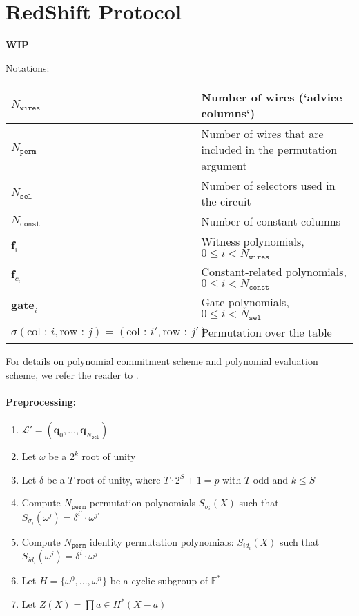 \section{RedShift Protocol}
\label{section:protocol}
\textbf{WIP}

Notations:

\begin{center}
\begin{table}[H]
\begin{tabular}{| l | l |}
 	\hline
	$N_{\texttt{wires}}$ & Number of wires (`advice columns`) \\
	\hline
	$N_{\texttt{perm}}$ & Number of wires that are included in the permutation argument \\
	\hline
	$N_{\texttt{sel}}$ & Number of selectors used in the circuit \\
	\hline
	$N_{\texttt{const}}$ & Number of constant columns  \\
	\hline
	$\textbf{f}_i$ & Witness polynomials, $0 \leq i < N_{\texttt{wires}}$  \\
	\hline
	$\textbf{f}_{c_i}$ & Constant-related polynomials, $0 \leq i < N_{\texttt{const}}$  \\
	\hline
	$\textbf{gate}_i$ & Gate polynomials, $0 \leq i < N_{\texttt{sel}}$  \\
	\hline
	$\sigma(\text{col : } i, \text{row : } j) = (\text{col : } i', \text{row : } j')$ & Permutation over the table \\
	\hline
\end{tabular}
\end{table}
\end{center}

For details on polynomial commitment scheme and polynomial evaluation scheme, we refer the reader to \cite{cryptoeprint:2019:1400}.

\paragraph{Preprocessing:}


\begin{algorithm}[h]
\begin{enumerate}
	\item $\mathcal{L}' = (\textbf{q}_{0}, ..., \textbf{q}_{N_{\texttt{sel}}})$
	\item Let $\omega$ be a $2^k$ root of unity
	\item Let $\delta$ be a $T$ root of unity, where $T \cdot 2^S + 1 = p$ with $T$ odd and $k \leq S$
	\item Compute $N_{\texttt{perm}}$ permutation polynomials $S_{\sigma_i}(X)$ such that $S_{\sigma_i}(\omega^j) = \delta^{i'} \cdot \omega^{j'}$
	\item Compute $N_{\texttt{perm}}$ identity permutation polynomials: $S_{id_i}(X)$ such that $S_{id_i}(\omega^j) = \delta^i \cdot \omega^j$
	\item Let $H = \{\omega^0, ..., \omega^n\}$ be a cyclic subgroup of $\mathbb{F}^*$
	\item Let $Z(X) = \prod\limits{a \in H^*}(X - a)$
\end{enumerate}
\end{algorithm}

